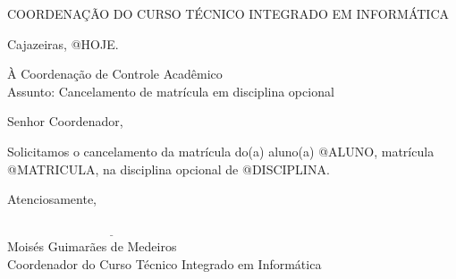 \documentclass[a4paper, 12pt]{letter}
\begin{document}
{\bf
{\selectfont
    \begin{center}
        {\selectfont
            COORDENAÇÃO DO CURSO TÉCNICO INTEGRADO EM INFORMÁTICA
        }
    \end{center}
}

\begin{flushright}
Cajazeiras, @HOJE.
\end{flushright}

\noindent À Coordenação de Controle Acadêmico\\
Assunto: Cancelamento de matrícula em disciplina opcional

\noindent Senhor Coordenador,

\onehalfspacing Solicitamos o cancelamento da matrícula do(a) aluno(a) @ALUNO, matrícula @MATRICULA, na disciplina opcional de @DISCIPLINA.

Atenciosamente,

\indent $\underline{\hspace{7cm}}$\\
\indent Moisés Guimarães de Medeiros\\
\indent Coordenador do Curso Técnico Integrado em Informática\\
}
\end{document}
